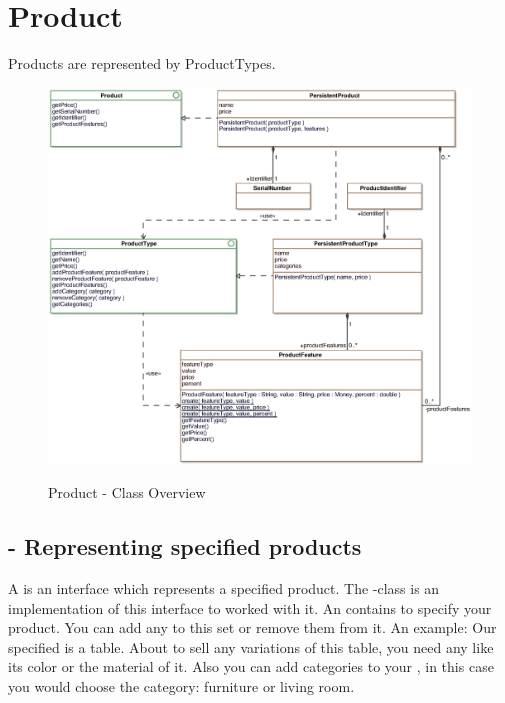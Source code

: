 \newpage
\section{Product}
\label{sec:product}

Products are represented by ProductTypes.

\begin{figure}[ht]
	\centering
  \includegraphics[width=1.0\textwidth]{images/Product_Overview.eps}
	\label{product_overview}
	\caption{Product - Class Overview}
\end{figure}

\subsection{ - Representing specified products}
A  is an interface which represents a specified product. The -class is an implementation of this interface to worked with it.
An  contains  to specify your product. You can add any   to this set or remove them from it.
An example: Our specified  is a table. About to sell any variations of this table, you need any  like its color or the material of it. 
Also you can add categories to your , in this case you would choose the category: furniture or living room.

